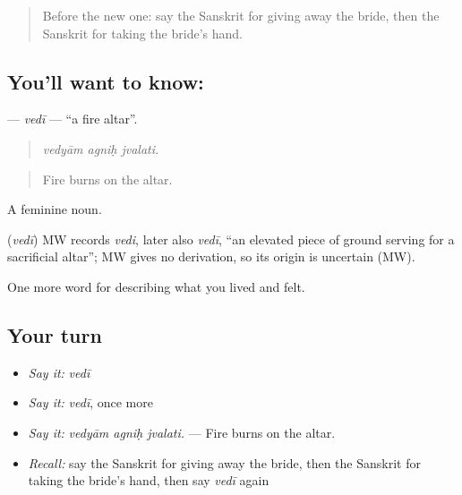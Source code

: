 \label{lesson:SA-C497-vedi}



\begin{quote}
Before the new one: say the Sanskrit for giving away the bride, then the Sanskrit for taking the bride's hand.
\end{quote}

\subsection*{You'll want to know: }
\textbf{} — \emph{vedī} — \textquotedblleft{}a fire altar\textquotedblright{}.

\begin{quote}
  
\end{quote}

\begin{quote}
\emph{vedyām agniḥ jvalati.}
\end{quote}

\begin{quote}
Fire burns on the altar.
\end{quote}

A feminine noun.

\begin{cousinweb}
\textbf{} (\emph{vedī}) MW records \emph{vedi}, later also \emph{vedī}, \textquotedblleft{}an elevated piece of ground serving for a sacrificial altar\textquotedblright{}; MW gives no derivation, so its origin is uncertain (MW).
\end{cousinweb}

\begin{grammarlens}[title={What you've built}]
One more word for describing what you lived and felt.
\end{grammarlens}

\subsection*{Your turn}
\begin{itemize}
\raggedright
  \item \emph{Say it:} \emph{vedī}
  \item \emph{Say it:} \emph{vedī}, once more
  \item \emph{Say it:} \emph{vedyām agniḥ jvalati.} — Fire burns on the altar.
  \item \emph{Recall:} say the Sanskrit for giving away the bride, then the Sanskrit for taking the bride's hand, then say \emph{vedī} again
\end{itemize}

